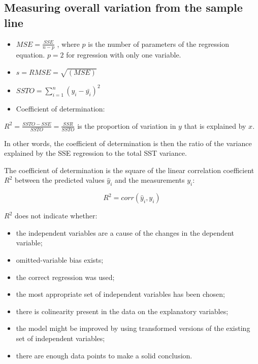 \documentclass[
]{report}
\providecommand{\tightlist}{%
  \setlength{\itemsep}{0pt}\setlength{\parskip}{0pt}}
\begin{document}
\hypertarget{measuring-overall-variation-from-the-sample-line}{%
\subsection{Measuring overall variation from the sample line}\label{measuring-overall-variation-from-the-sample-line}}

\begin{itemize}
\item
  \(MSE = \frac{SSE}{n-p}\) , where \(p\) is the number of parameters of the regression equation. \(p=2\) for regression with only one variable.
\item
  \(s = RMSE = \sqrt{(MSE)}\)
\item
  \(SSTO=\sum_{i=1}^n (y_i -\bar{y_i})^2\)
\item
  Coefficient of determination:
\end{itemize}

\(R^2 = \frac{SSTO-SSE}{SSTO} = \frac{SSR}{SSTO}\) is the proportion of variation in \(y\) that is explained by \(x\).

In other words, the coefficient of determination is then the ratio of the variance explained by the SSE regression to the total SST variance.

The coefficient of determination is the square of the linear correlation coefficient \(R^2\) between the predicted values \(\hat{y}_{i}\) and the measurements \(y_i\):

\[R^2=corr(\hat{y}_{i},y_i)\]

\(R^2\) does not indicate whether:

\begin{itemize}
\tightlist
\item
  the independent variables are a cause of the changes in the dependent variable;
\item
  omitted-variable bias exists;
\item
  the correct regression was used;
\item
  the most appropriate set of independent variables has been chosen;
\item
  there is colinearity present in the data on the explanatory variables;
\item
  the model might be improved by using transformed versions of the existing set of independent variables;
\item
  there are enough data points to make a solid conclusion.
\end{itemize}
\end{document}
